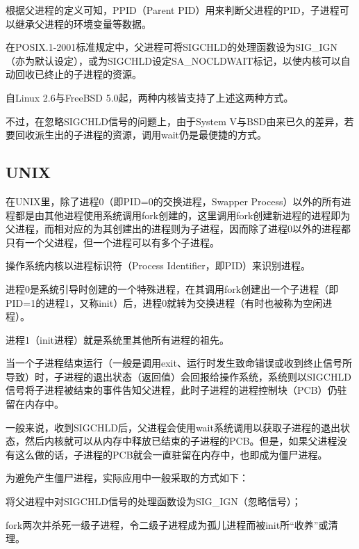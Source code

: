根据父进程的定义可知，PPID（Parent PID）用来判断父进程的PID，子进程可以继承父进程的环境变量等数据。

在POSIX.1-2001标准规定中，父进程可将SIGCHLD的处理函数设为SIG\_IGN（亦为默认设定），或为SIGCHLD设定SA\_NOCLDWAIT标记，以使内核可以自动回收已终止的子进程的资源。


自Linux 2.6与FreeBSD 5.0起，两种内核皆支持了上述这两种方式。

不过，在忽略SIGCHLD信号的问题上，由于System V与BSD由来已久的差异，若要回收派生出的子进程的资源，调用wait仍是最便捷的方式。


\subsection{UNIX}

在UNIX里，除了进程0（即PID=0的交换进程，Swapper Process）以外的所有进程都是由其他进程使用系统调用fork创建的，这里调用fork创建新进程的进程即为父进程，而相对应的为其创建出的进程则为子进程，因而除了进程0以外的进程都只有一个父进程，但一个进程可以有多个子进程。

操作系统内核以进程标识符（Process Identifier，即PID）来识别进程。

\begin{compactitem}
\item 进程0是系统引导时创建的一个特殊进程，在其调用fork创建出一个子进程（即PID=1的进程1，又称init）后，进程0就转为交换进程（有时也被称为空闲进程）。
\item 进程1（init进程）就是系统里其他所有进程的祖先。
\end{compactitem}

当一个子进程结束运行（一般是调用exit、运行时发生致命错误或收到终止信号所导致）时，子进程的退出状态（返回值）会回报给操作系统，系统则以SIGCHLD信号将子进程被结束的事件告知父进程，此时子进程的进程控制块（PCB）仍驻留在内存中。


一般来说，收到SIGCHLD后，父进程会使用wait系统调用以获取子进程的退出状态，然后内核就可以从内存中释放已结束的子进程的PCB。但是，如果父进程没有这么做的话，子进程的PCB就会一直驻留在内存中，也即成为僵尸进程。


为避免产生僵尸进程，实际应用中一般采取的方式如下：

\begin{compactitem}
\item 将父进程中对SIGCHLD信号的处理函数设为SIG\_IGN（忽略信号）；
\item fork两次并杀死一级子进程，令二级子进程成为孤儿进程而被init所“收养”或清理。
\end{compactitem}

